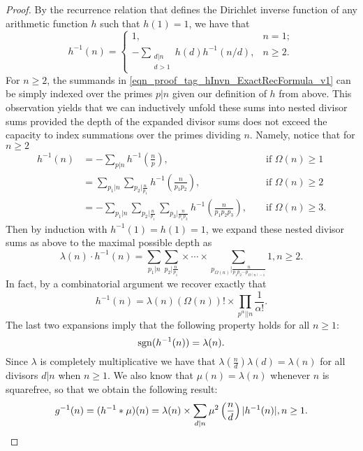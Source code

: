 \documentclass[11pt,reqno,a4letter]{article}
\numberwithin{figure}{section}
\numberwithin{table}{section}
\theoremstyle{plain}
\numberwithin{theorem}{section}
\theoremstyle{definition}
\begin{document}
\begin{proof}
By the recurrence relation that defines the Dirichlet inverse function of any 
arithmetic function $h$ such that $h(1) = 1$, we have that \cite[\S 2.7]{APOSTOLANUMT} 
\begin{equation} 
\label{eqn_proof_tag_hInvn_ExactRecFormula_v1}
h^{-1}(n) = \begin{cases} 
            1, & n = 1; \\ 
            -\sum\limits_{\substack{d|n \\ d>1}} h(d) h^{-1}(n/d), & n \geq 2. 
            \end{cases} 
\end{equation} 
For $n \geq 2$, the summands in \eqref{eqn_proof_tag_hInvn_ExactRecFormula_v1} 
can be simply indexed over the primes $p|n$ given our definition of $h$ from above. 
This observation yields that we can inductively 
unfold these sums into nested divisor sums provided the depth of the 
expanded divisor sums does not exceed the 
capacity to index summations over the primes dividing $n$. Namely, notice that for $n \geq 2$ 
\begin{align*} 
h^{-1}(n) & = -\sum_{p|n} h^{-1}\left(\frac{n}{p}\right), && \text{\ if\ } \Omega(n) \geq 1 \\ 
     & = \sum_{p_1|n} \sum_{p_2|\frac{n}{p_1}} h^{-1}\left(\frac{n}{p_1p_2}\right), && \text{\ if\ } \Omega(n) \geq 2 \\ 
     & = -\sum_{p_1|n} \sum_{p_2|\frac{n}{p_1}} \sum_{p_3|\frac{n}{p_1p_2}} h^{-1}\left(\frac{n}{p_1p_2p_3}\right), 
     && \text{\ if\ } \Omega(n) \geq 3. 
\end{align*} 
Then by induction with $h^{-1}(1) = h(1) = 1$, we expand these 
nested divisor sums as above to the maximal possible depth as 
\begin{equation} 
\label{eqn_proof_tag_hInvn_ExactNestedSumFormula_v2} 
\lambda(n) \cdot h^{-1}(n) = \sum_{p_1|n} \sum_{p_2|\frac{n}{p_1}} \times \cdots \times 
     \sum_{p_{\Omega(n)}|\frac{n}{p_1p_2 \cdots p_{\Omega(n)-1}}} 1, n \geq 2. 
\end{equation} 
In fact, by a combinatorial argument we recover exactly that 
\begin{equation} 
\label{eqn_proof_tag_hInvn_ExactNestedSumFormula_CombInterpetIdent_v3} 
h^{-1}(n) = \lambda(n) (\Omega(n))! \times \prod_{p^{\alpha} || n} \frac{1}{\alpha!}. 
\end{equation} 
The last two expansions imply that the following property holds for all $n \geq 1$: 
\begin{equation} 
\notag 
\operatorname{sgn}(h^{-1}(n)) = \lambda(n). 
\end{equation} 
Since $\lambda$ is completely multiplicative we have that 
$\lambda\left(\frac{n}{d}\right) \lambda(d) = \lambda(n)$ for all divisors 
$d|n$ when $n \geq 1$. We also know that $\mu(n) = \lambda(n)$ whenever $n$ is squarefree, 
so that we obtain the following result: 
\[
g^{-1}(n) = (h^{-1} \ast \mu)(n) = \lambda(n) \times \sum_{d|n} \mu^2\left(\frac{n}{d}\right) |h^{-1}(n)|, n \geq 1. 
     \qedhere 
\]
\end{proof} 
\end{document}
